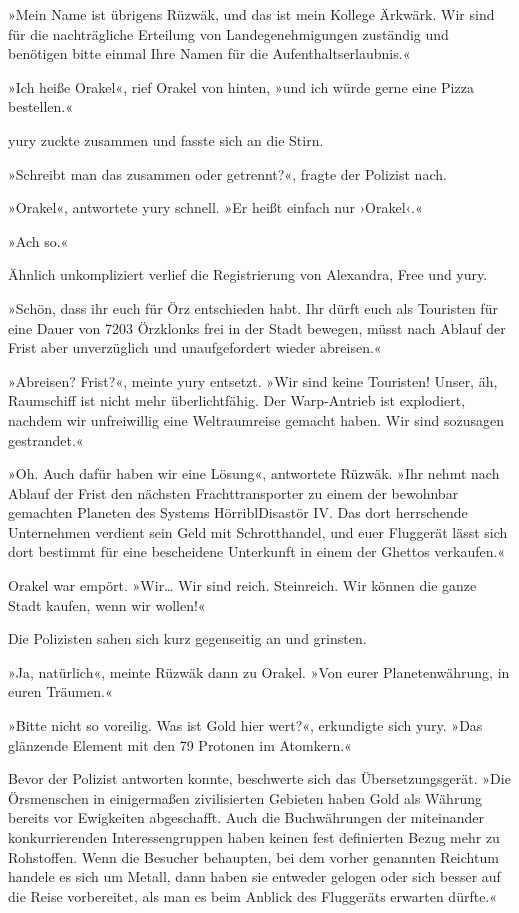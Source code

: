 »Mein Name ist übrigens Rüzwäk, und das ist mein Kollege Ärkwärk. Wir sind für die nachträgliche Erteilung von Landegenehmigungen zuständig und benötigen bitte einmal Ihre Namen für die Aufenthaltserlaubnis.«

»Ich heiße Orakel«, rief Orakel von hinten, »und ich würde gerne eine Pizza bestellen.«

yury zuckte zusammen und fasste sich an die Stirn.

»Schreibt man das zusammen oder getrennt?«, fragte der Polizist nach.

»Orakel«, antwortete yury schnell. »Er heißt einfach nur ›Orakel‹.«

»Ach so.«

Ähnlich unkompliziert verlief die Registrierung von Alexandra, Free und yury.

»Schön, dass ihr euch für Örz entschieden habt. Ihr dürft euch als Touristen für eine Dauer von 7203 Örzklonks frei in der Stadt bewegen, müsst nach Ablauf der Frist aber unverzüglich und unaufgefordert wieder abreisen.«

»Abreisen? Frist?«, meinte yury entsetzt. »Wir sind keine Touristen! Unser, äh, Raumschiff ist nicht mehr überlichtfähig. Der Warp-Antrieb ist explodiert, nachdem wir unfreiwillig eine Weltraumreise gemacht haben. Wir sind sozusagen gestrandet.«

»Oh. Auch dafür haben wir eine Lösung«, antwortete Rüzwäk. »Ihr nehmt nach Ablauf der Frist den nächsten Frachttransporter zu einem der bewohnbar gemachten Planeten des Systems HörriblDisastör IV. Das dort herrschende Unternehmen verdient sein Geld mit Schrotthandel, und euer Fluggerät lässt sich dort bestimmt für eine bescheidene Unterkunft in einem der Ghettos verkaufen.«

Orakel war empört. »Wir… Wir sind reich. Steinreich. Wir können die ganze Stadt kaufen, wenn wir wollen!«

Die Polizisten sahen sich kurz gegenseitig an und grinsten.

»Ja, natürlich«, meinte Rüzwäk dann zu Orakel. »Von eurer Planetenwährung, in euren Träumen.«

»Bitte nicht so voreilig. Was ist Gold hier wert?«, erkundigte sich yury. »Das glänzende Element mit den 79 Protonen im Atomkern.«

Bevor der Polizist antworten konnte, beschwerte sich das Übersetzungsgerät. »Die Örsmenschen in einigermaßen zivilisierten Gebieten haben Gold als Währung bereits vor Ewigkeiten abgeschafft. Auch die Buchwährungen der miteinander konkurrierenden Interessengruppen haben keinen fest definierten Bezug mehr zu Rohstoffen. Wenn die Besucher behaupten, bei dem vorher genannten Reichtum handele es sich um Metall, dann haben sie entweder gelogen oder sich besser auf die Reise vorbereitet, als man es beim Anblick des Fluggeräts erwarten dürfte.«


